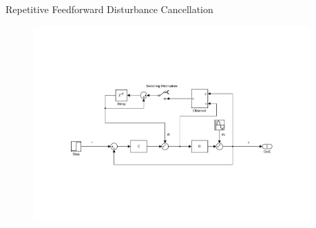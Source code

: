 \documentclass[10pt]{beamer}
\begin{document}
\begin{frame}{Repetitive Feedforward Disturbance Cancellation}
  \begin{figure}[h]
    \centering %
    \includegraphics[width=0.95\textwidth, trim=6cm 5.5cm 5.2cm 5.5cm, clip=true]{../fig/matlab/ffrep}
  \end{figure}
\end{frame}
\end{document}
